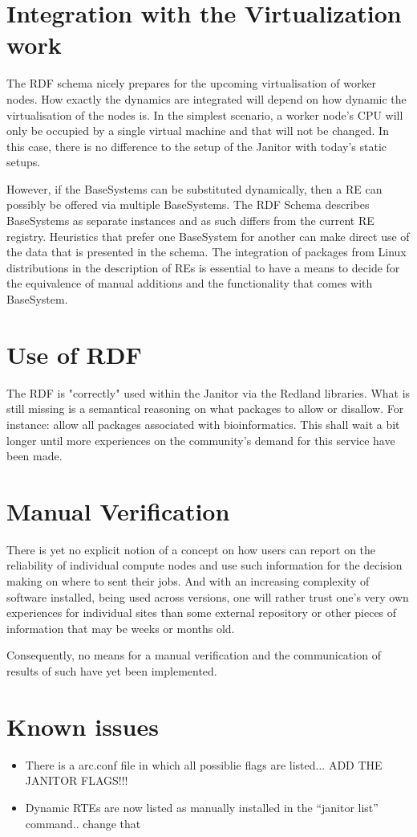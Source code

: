 \section{Integration with the Virtualization work}

The RDF schema nicely prepares for the upcoming virtualisation of worker
nodes.  How exactly the dynamics are integrated will depend on how
dynamic the virtualisation of the nodes is. In the simplest scenario,
a worker node's CPU will only be occupied by a single virtual machine
and that will not be changed. In this case, there is no difference to
the setup of the Janitor with today's static setups.

However, if the BaseSystems can be substituted dynamically, then a RE
can possibly be offered via multiple BaseSystems. The RDF
Schema describes BaseSystems as separate instances and as such differs
from the current RE registry.  Heuristics that prefer one BaseSystem for
another can make direct use of the data that is presented in the schema.
The integration of packages from Linux distributions in the description
of REs is essential to have a means to decide for the equivalence of
manual additions and the functionality that comes with BaseSystem.

\section{Use of RDF}

The RDF is "correctly" used within the Janitor via the Redland libraries.
What is still missing is a semantical reasoning on what packages to
allow or disallow. For instance: allow all packages associated with
bioinformatics. This shall wait a bit longer until more experiences
on the community's demand for this service have been made.

\section{Manual Verification}

There is yet no explicit notion of a concept on how users can report
on the reliability of individual compute nodes and use such information
for the decision making on where to sent their jobs. And with an increasing
complexity of software installed, being used across versions, one will
rather trust one's very own experiences for individual sites than some
external repository or other pieces of information that may be weeks
or months old.

Consequently, no means for a manual verification and the communication
of results of such have yet been implemented.


\section{Known issues}
\begin{itemize}
 \item There is a arc.conf file in which all possiblie flags are listed... ADD THE JANITOR FLAGS!!!
 \item Dynamic RTEs are now listed as manually installed in the ``janitor list'' command.. change that
\end{itemize}
